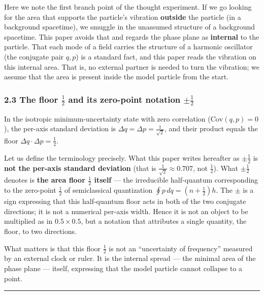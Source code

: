 \documentclass[
]{article}
\begin{document}
Here we note the first branch point of the thought experiment. If we go
looking for the area that supports the particle's vibration
\textbf{outside} the particle (in a background spacetime), we smuggle in
the unassumed structure of a background spacetime. This paper avoids
that and regards the phase plane as \textbf{internal} to the particle.
That each mode of a field carries the structure of a harmonic oscillator
(the conjugate pair \(q,p\)) is a standard fact, and this paper reads
the vibration on this internal area. That is, no external partner is
needed to turn the vibration; we assume that the area is present inside
the model particle from the start.

\subsubsection{\texorpdfstring{2.3 The floor \(\tfrac12\) and its
zero-point notation
\(\pm\tfrac12\)}{2.3 The floor \textbackslash tfrac12 and its zero-point notation \textbackslash pm\textbackslash tfrac12}}\label{the-floor-tfrac12-and-its-zero-point-notation-pmtfrac12}

In the isotropic minimum-uncertainty state with zero correlation
(\(\mathrm{Cov}(q,p)=0\)), the per-axis standard deviation is
\(\Delta q=\Delta p=\tfrac{1}{\sqrt2}\), and their product equals the
floor \(\Delta q\cdot\Delta p=\tfrac12\).

Let us define the terminology precisely. What this paper writes
hereafter as \(\pm\tfrac12\) is \textbf{not the per-axis standard
deviation} (that is \(\tfrac{1}{\sqrt2}\approx0.707\), not
\(\tfrac12\)). What \(\pm\tfrac12\) denotes is \textbf{the area floor
\(\tfrac12\) itself} --- the irreducible half-quantum corresponding to
the zero-point \(\tfrac12\) of semiclassical quantization
\(\oint p\,dq=(n+\tfrac12)h\). The \(\pm\) is a sign expressing that
this half-quantum floor acts in both of the two conjugate directions; it
is not a numerical per-axis width. Hence it is not an object to be
multiplied as in \(0.5\times0.5\), but a notation that attributes a
single quantity, the floor, to two directions.

What matters is that this floor \(\tfrac12\) is not an ``uncertainty of
frequency'' measured by an external clock or ruler. It is the internal
spread --- the minimal area of the phase plane --- itself, expressing
that the model particle cannot collapse to a point.

\begin{center}\rule{0.5\linewidth}{0.5pt}\end{center}
\end{document}
